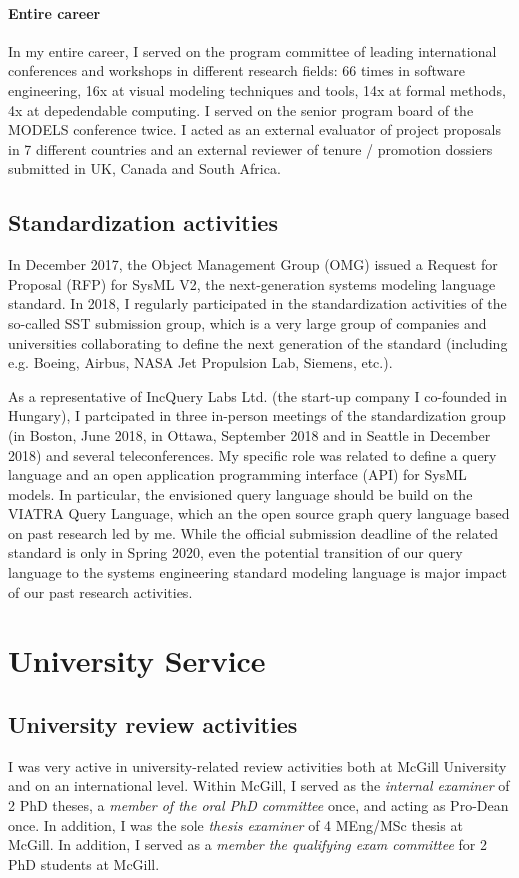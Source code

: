\paragraph{Entire career}
In my entire career, I served on the program committee of leading international conferences and workshops in different research fields: 66 times in software engineering, 16x at visual modeling techniques and tools, 14x at formal methods, 4x at depedendable computing. I served on the senior program board of the MODELS conference twice. I acted as an external evaluator of project proposals in 7 different countries and an external reviewer of tenure / promotion dossiers submitted in UK, Canada and South Africa. 

\subsection{Standardization activities}
In December 2017, the Object Management Group (OMG) issued a Request for Proposal (RFP) for SysML V2, the next-generation systems modeling language standard. In 2018, I regularly participated in the standardization activities of the so-called SST submission group, which is a very large group of companies and universities collaborating to define the next generation of the standard (including e.g. Boeing, Airbus, NASA Jet Propulsion Lab, Siemens, etc.).

As a representative of IncQuery Labs Ltd. (the start-up company I co-founded in Hungary), I partcipated in three in-person meetings of the standardization group (in Boston, June 2018, in Ottawa, September 2018 and in Seattle in December 2018) and several teleconferences. My specific role was related to define a query language and an open application programming interface (API) for SysML models. In particular, the envisioned query language should be build on the VIATRA Query Language, which an the open source graph query language based on past research led by me. While the official submission deadline of the related standard is only in Spring 2020, even the potential transition of our query language to the systems engineering standard modeling language is major impact of our past research activities. 

\section{University Service}

\subsection{University review activities}
I was very active in university-related review activities both at McGill University and on an international level. Within McGill, I served as the \emph{internal examiner} of 2 PhD theses, a \emph{member of the oral PhD committee} once, and acting as Pro-Dean once. In addition, I was the sole \emph{thesis examiner} of 4 MEng/MSc thesis at McGill. In addition, I served as a \emph{member the qualifying exam committee} for 2 PhD students at McGill. 

